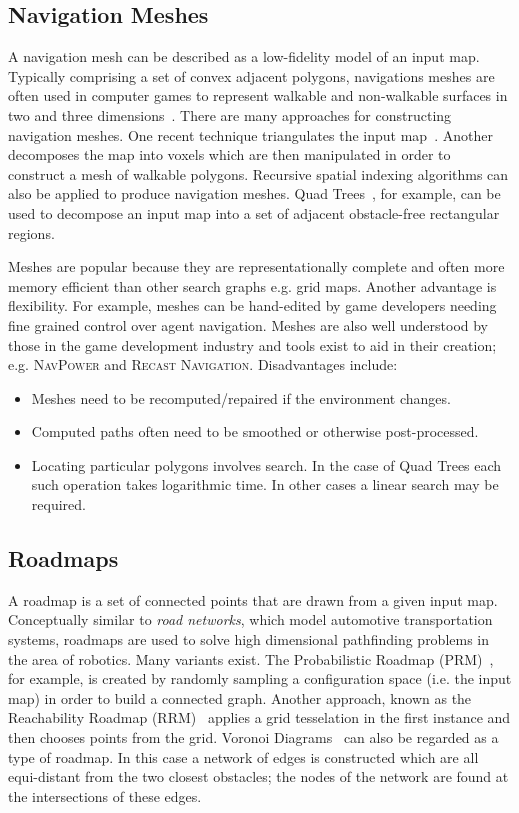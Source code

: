 \subsection{Navigation Meshes}
\label{cha::lit::graphs::nav}
A navigation mesh can be described as a low-fidelity model of an input map. 
Typically comprising a set of convex adjacent polygons, navigations meshes are
often used in computer games to represent walkable and non-walkable surfaces in
two and three dimensions~\citep{snook00,tozour02}.
There are many approaches for constructing navigation meshes.
One recent technique triangulates the input map~\citep{demyen07,kallmann10}.  
Another decomposes the map into voxels which are then manipulated in order to construct a 
mesh of walkable polygons. 
Recursive spatial indexing algorithms can also be applied to produce navigation meshes. 
Quad Trees~\citep{finkel74,samet85}, for example, can be used to decompose an input
map into a set of adjacent obstacle-free rectangular regions. 

Meshes are popular because they are representationally complete and often more
memory efficient than other search graphs e.g. grid maps. Another advantage is
flexibility. For example, meshes can be hand-edited by game developers needing
fine grained control over agent navigation. Meshes are also well understood by 
those in the game development industry and tools exist to aid in their creation; 
e.g. \textsc{NavPower} and \textsc{Recast Navigation}. Disadvantages include: 
\begin{itemize}
\item Meshes need to be recomputed/repaired if the environment changes.
\item Computed paths often need to be smoothed or otherwise post-processed.
\item Locating particular polygons involves search. In the case 
of Quad Trees each such operation takes logarithmic time. In other cases
a linear search may be required.
\end{itemize}


\subsection{Roadmaps}
\label{cha::lit::graphs::road}
A roadmap is a set of connected points that are drawn from a given input map.
Conceptually similar to \emph{road networks}, which model automotive
transportation systems, roadmaps are used to solve high dimensional pathfinding
problems in the area of robotics.  Many variants exist. The Probabilistic
Roadmap (PRM)~\citep{kavraki94}, for example,
 is created by randomly sampling a configuration space (i.e. the input map) in
order to build a connected graph. Another approach, known as the Reachability
Roadmap (RRM)~\citep{geraerts05} applies a grid tesselation in the first
instance and then chooses points from the grid.  Voronoi Diagrams~\citep{aurenhammer91}
can also be regarded as a type of roadmap. In this case a network of edges is constructed
which are all equi-distant from the two closest obstacles; the nodes of the network are 
found at the intersections of these edges.

